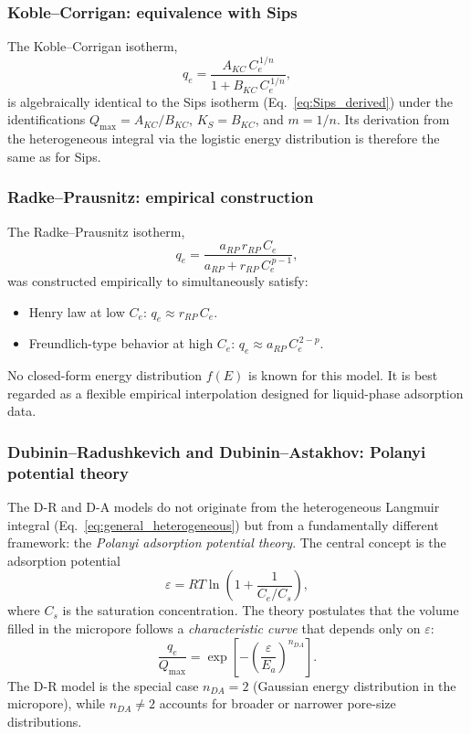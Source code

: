 \documentclass[12pt]{article}
\begin{document}
	\subsubsection{Koble--Corrigan: equivalence with Sips}

	The Koble--Corrigan isotherm,
	\begin{equation}
		q_e = \frac{A_{KC}\, C_e^{\,1/n}}{1 + B_{KC}\, C_e^{\,1/n}},
	\end{equation}
	is algebraically identical to the Sips isotherm
	(Eq.~\eqref{eq:Sips_derived}) under the identifications
	$Q_{\max} = A_{KC}/B_{KC}$, $K_S = B_{KC}$, and $m = 1/n$.
	Its derivation from the heterogeneous integral via the logistic
	energy distribution is therefore the same as for Sips.

	\subsubsection{Radke--Prausnitz: empirical construction}

	The Radke--Prausnitz isotherm,
	\begin{equation}
		q_e = \frac{a_{RP}\, r_{RP}\, C_e}
		{a_{RP} + r_{RP}\, C_e^{\,p-1}},
	\end{equation}
	was constructed empirically to simultaneously satisfy:
	\begin{itemize}
		\item Henry law at low $C_e$: $q_e \approx r_{RP}\,C_e$.
		\item Freundlich-type behavior at high $C_e$:
		$q_e \approx a_{RP}\, C_e^{\,2-p}$.
	\end{itemize}
	No closed-form energy distribution $f(E)$ is known for this model.
	It is best regarded as a flexible empirical interpolation designed
	for liquid-phase adsorption data.

	\subsubsection{Dubinin--Radushkevich and Dubinin--Astakhov:
		Polanyi potential theory}

	The D-R and D-A models do not originate from the heterogeneous
	Langmuir integral (Eq.~\eqref{eq:general_heterogeneous}) but from
	a fundamentally different framework: the \emph{Polanyi adsorption
	potential theory}. The central concept is the adsorption potential
	\begin{equation}
		\varepsilon = RT\ln\!\left(1 + \frac{1}{C_e/C_s}\right),
		\label{eq:polanyi_potential}
	\end{equation}
	where $C_s$ is the saturation concentration.
	The theory postulates that the volume filled in the micropore
	follows a \emph{characteristic curve} that depends only on
	$\varepsilon$:
	\begin{equation}
		\frac{q_e}{Q_{\max}}
		= \exp\!\left[-\left(\frac{\varepsilon}{E_a}\right)^{n_{DA}}
		\right].
		\label{eq:DA_derived}
	\end{equation}
	The D-R model is the special case $n_{DA} = 2$ (Gaussian energy
	distribution in the micropore), while $n_{DA} \neq 2$ accounts for
	broader or narrower pore-size distributions.
\end{document}
